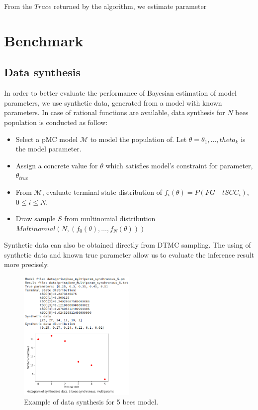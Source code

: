 \documentclass[12pt]{article}
\theoremstyle{definition}
\begin{document}
From the $Trace$ returned by the algorithm, we estimate parameter 

\section{Benchmark}
\subsection{Data synthesis}
In order to better evaluate the performance of Bayesian estimation of model
parameters, we use synthetic data, generated from a model with known parameters.
In case of rational functions are available, data synthesis for $N$ bees
population is conducted as follow:
\begin{itemize}
\item Select a pMC model $\mathcal{M}$ to model the population of. Let
  $\theta=\theta_1,\ldots,theta_k$ is the model parameter.
\item Assign a concrete value for $\theta$ which satisfies model's constraint
  for parameter, $\theta_{true}$
\item From $\mathcal{M}$, evaluate terminal state distribution of $f_i(\theta) =
  P(FG\quad tSCC_i)$, $0 \leq i \leq N$.
\item Draw sample $S$ from multinomial distribution $Multinomial(N,
  (f_0(\theta),\ldots,f_N(\theta)))$
\end{itemize}
Synthetic data can also be obtained directly from DTMC sampling. The using of
synthetic data and known true parameter allow us to evaluate the inference
result more precisely.
\begin{figure}[H]
  \centering
  \includegraphics[width=0.5\textwidth,keepaspectratio]{figures/data_synthesis.png}
  \caption{Example of data synthesis for 5 bees model.}
\end{figure}
\end{document}
